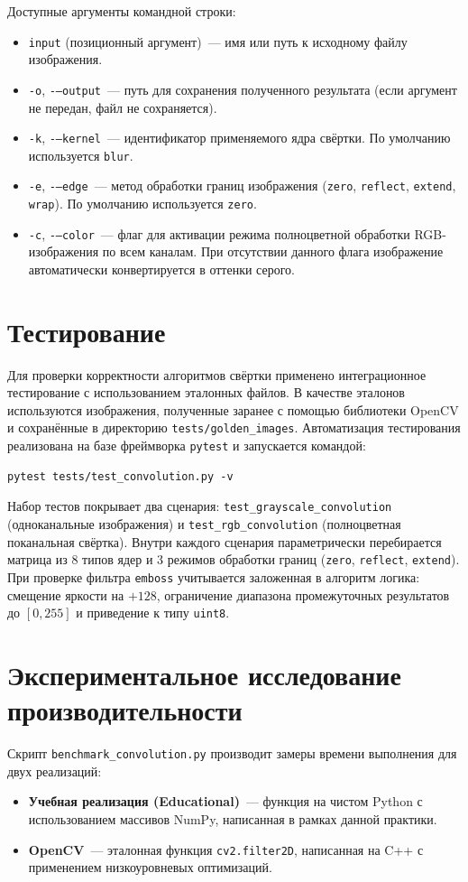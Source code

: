 \documentclass[a4paper]{article}
\begin{document}
Доступные аргументы командной строки:
\begin{itemize}
    \item \texttt{input} (позиционный аргумент)~--- имя или путь к исходному файлу изображения.
    \item \texttt{-o}, \texttt{-–output}~--- путь для сохранения полученного результата (если аргумент не передан, файл не сохраняется).
    \item \texttt{-k}, \texttt{-–kernel}~--- идентификатор применяемого ядра свёртки. По умолчанию используется \texttt{blur}.
    \item \texttt{-e}, \texttt{-–edge}~--- метод обработки границ изображения (\texttt{zero}, \texttt{reflect}, \texttt{extend}, \texttt{wrap}). По умолчанию используется \texttt{zero}.
    \item \texttt{-c}, \texttt{-–color}~--- флаг для активации режима полноцветной обработки RGB-изображения по всем каналам. При отсутствии данного флага изображение автоматически конвертируется в оттенки серого.
\end{itemize}

\section{Тестирование}

Для проверки корректности алгоритмов свёртки применено интеграционное тестирование с использованием эталонных файлов. В качестве эталонов используются изображения, полученные заранее с помощью библиотеки OpenCV и сохранённые в директорию \texttt{tests/golden\_images}. Автоматизация тестирования реализована на базе фреймворка \texttt{pytest} и запускается командой:

\begin{verbatim}
pytest tests/test_convolution.py -v
\end{verbatim}

Набор тестов покрывает два сценария: \texttt{test\_grayscale\_convolution} (одноканальные изображения) и \texttt{test\_rgb\_convolution} (полноцветная поканальная свёртка). Внутри каждого сценария параметрически перебирается матрица из 8 типов ядер и 3 режимов обработки границ (\texttt{zero}, \texttt{reflect}, \texttt{extend}). При проверке фильтра \texttt{emboss} учитывается заложенная в алгоритм логика: смещение яркости на $+128$, ограничение диапазона промежуточных результатов до $[0, 255]$ и приведение к типу \texttt{uint8}.

\section{Экспериментальное исследование производительности}
Скрипт \verb|benchmark_convolution.py| производит замеры времени выполнения для двух реализаций:
\begin{itemize}
    \item \textbf{Учебная реализация (Educational)}~--- функция на чистом Python с использованием массивов NumPy, написанная в рамках данной практики.
    \item \textbf{OpenCV}~--- эталонная функция \verb|cv2.filter2D|, написанная на C++ с применением низкоуровневых оптимизаций.
\end{itemize}
\end{document}
